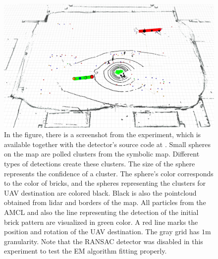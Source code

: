 \begin{figure}[H]
	\centering
	\includegraphics[scale=0.3]{fig/experiment}
	\caption[Experiment results]{In the figure, there is a screenshot from the experiment, which is available together with the detector's source code at \footnotemark. Small spheres on the map are polled clusters from the symbolic map. Different types of detections create these clusters. The size of the sphere represents the confidence of a cluster. The sphere's color corresponds to the color of bricks, and the spheres representing the clusters for UAV destination are colored black. Black is also the pointcloud obtained from lidar and borders of the map. All particles from the AMCL and also the line representing the detection of the initial brick pattern are visualized in green color. A red line marks the position and rotation of the UAV destination. The gray grid has $1$m granularity. Note that the RANSAC detector was disabled in this experiment to test the EM algorithm fitting properly.}
	\label{fig:experiment}
\end{figure}

